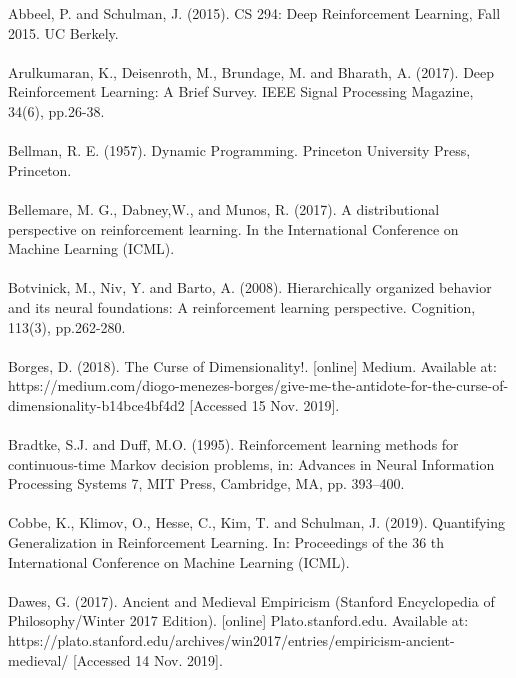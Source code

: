 \documentclass[notitlepage,a4paper,11pt]{article}
\begin{document}



Abbeel, P. and Schulman, J. (2015). CS 294: Deep Reinforcement Learning, Fall 2015. UC Berkely.\\\\
Arulkumaran, K., Deisenroth, M., Brundage, M. and Bharath, A. (2017). Deep Reinforcement Learning: A Brief Survey. IEEE Signal Processing Magazine, 34(6), pp.26-38.\\\\
Bellman, R. E. (1957). Dynamic Programming. Princeton University Press, Princeton.\\\\
Bellemare, M. G., Dabney,W., and Munos, R. (2017). A distributional perspective on reinforcement learning. In the International Conference on Machine Learning (ICML).\\\\
Botvinick, M., Niv, Y. and Barto, A. (2008). Hierarchically organized behavior and its neural foundations: A reinforcement learning perspective. Cognition, 113(3), pp.262-280.\\\\
Borges, D. (2018). The Curse of Dimensionality!. [online] Medium. Available at: https://medium.com/diogo-menezes-borges/give-me-the-antidote-for-the-curse-of-dimensionality-b14bce4bf4d2 [Accessed 15 Nov. 2019].\\\\
Bradtke, S.J. and Duff, M.O. (1995). Reinforcement learning methods for continuous-time Markov decision problems, in: Advances in Neural Information Processing Systems 7, MIT Press, Cambridge, MA, pp. 393–400.\\\\
Cobbe, K., Klimov, O., Hesse, C., Kim, T. and Schulman, J. (2019). Quantifying Generalization in Reinforcement Learning. In: Proceedings of the 36 th International Conference on Machine Learning (ICML).\\\\
Dawes, G. (2017). Ancient and Medieval Empiricism (Stanford Encyclopedia of Philosophy/Winter 2017 Edition). [online] Plato.stanford.edu. Available at: https://plato.stanford.edu/archives/win2017/entries/empiricism-ancient-medieval/ [Accessed 14 Nov. 2019].\\\\
\end{document}
